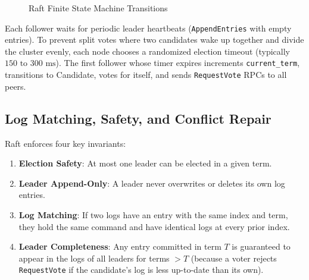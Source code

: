\begin{figure}[htbp]
\centering
{}
\caption{Raft Finite State Machine Transitions}
\label{fig:v4-ch02-raft-fsm}
\end{figure}

Each follower waits for periodic leader heartbeats (\texttt{AppendEntries} with empty entries). To prevent split votes where two candidates wake up together and divide the cluster evenly, each node chooses a randomized election timeout (typically $150\text{ to }300\text{ ms}$). The first follower whose timer expires increments \texttt{current\_term}, transitions to Candidate, votes for itself, and sends \texttt{RequestVote} RPCs to all peers.

\subsection{Log Matching, Safety, and Conflict Repair}

Raft enforces four key invariants:
\begin{enumerate}[leftmargin=18pt]
  \item \textbf{Election Safety}: At most one leader can be elected in a given term.
  \item \textbf{Leader Append-Only}: A leader never overwrites or deletes its own log entries.
  \item \textbf{Log Matching}: If two logs have an entry with the same index and term, they hold the same command and have identical logs at every prior index.
  \item \textbf{Leader Completeness}: Any entry committed in term $T$ is guaranteed to appear in the logs of all leaders for terms $> T$ (because a voter rejects \texttt{RequestVote} if the candidate's log is less up-to-date than its own).
\end{enumerate}

